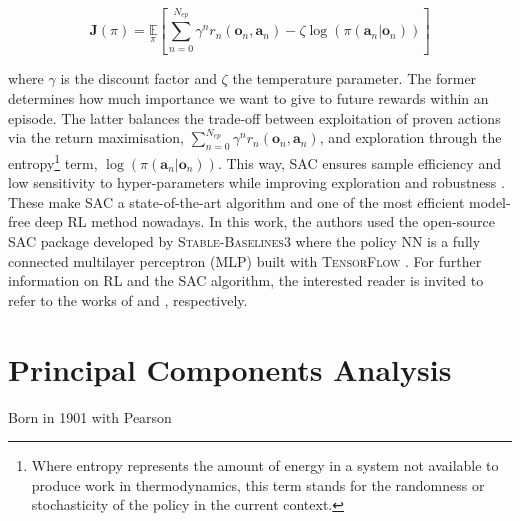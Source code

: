 \begin{equation}
    \label{eq:SAC_objective}
    \bm{J}(\pi) = \underset{\pi}{\mathbb{E}}\left[\underset{n=0}{\overset{N_{ep}}{\sum}}\gamma^n r_n\left(\bm{o}_n,\bm{a}_n \right) - \zeta \log \left(\pi\left(\bm{a}_n | \bm{o}_n\right) \right) \right]
\end{equation}

\noindent
where $\gamma$ is the discount factor and $\zeta$ the temperature parameter. The former determines how much importance we want to give to future rewards within an episode. The latter balances the trade-off between exploitation of proven actions via the return maximisation, \ie $\sum_{n=0}^{N_{ep}}\gamma^n r_n\left(\bm{o}_n,\bm{a}_n \right)$, and exploration through the entropy\footnote{Where entropy represents the amount of energy in a system not available to produce work in thermodynamics, this term stands for the randomness or stochasticity of the policy in the current context.} term, \ie $\log \left(\pi\left(\bm{a}_n | \bm{o}_n\right) \right)$. This way, \gls{SAC} ensures sample efficiency and low sensitivity to hyper-parameters while improving exploration \cite{haarnoja2017reinforcement} and robustness \cite{ziebart2010modeling}. These make \gls{SAC} a state-of-the-art algorithm and one of the most efficient model-free deep RL method nowadays. In this work, the authors used the open-source \gls{SAC} package developed by \textsc{Stable-Baselines3} \cite{raffin2021stable} where the policy \gls{NN} is a fully connected multilayer perceptron (MLP) built with \textsc{TensorFlow} \cite{abadi2016tensorflow}. For further information on \gls{RL} and the \gls{SAC} algorithm, the interested reader is invited to refer to the works of \citet{sutton2018reinforcement} and \citet{haarnoja2018soft}, respectively.

\section{Principal Components Analysis}
\label{sec:meth:PCA}

Born in 1901 with Pearson







